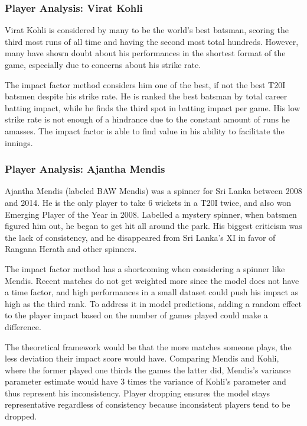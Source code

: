 \documentclass{article}[12pt]
\begin{document}
\subsubsection{Player Analysis: Virat Kohli}

Virat Kohli is considered by many to be the world's best batsman, scoring the third most runs of all time and having the second most total hundreds. \parencite{espn_2025_espncricinfo2} However, many have shown doubt about his performances in the shortest format of the game, especially due to concerns about his strike rate. \parencite{toisportsdesk_2024_usually}

The impact factor method considers him one of the best, if not the best T20I batsmen despite his strike rate. He is ranked the best batsman by total career batting impact, while he finds the third spot in batting impact per game. His low strike rate is not enough of a hindrance due to the constant amount of runs he amasses. The impact factor is able to find value in his ability to facilitate the innings.

\subsubsection{Player Analysis: Ajantha Mendis}

Ajantha Mendis (labeled BAW Mendis) was a spinner for Sri Lanka between 2008 and 2014. He is the only player to take 6 wickets in a T20I twice, and also  won Emerging Player of the Year in 2008. Labelled a mystery spinner, when batsmen figured him out, he began to get hit all around the park. His biggest criticism was the lack of consistency, and he disappeared from Sri Lanka's XI in favor of Rangana Herath and other spinners. \parencite{cricbuzz_2025_ajantha}

The impact factor method has a shortcoming when considering a spinner like Mendis. Recent matches do not get weighted more since the model does not have a time factor, and high performances in a small dataset could push his impact as high as the third rank. To address it in model predictions, adding a random effect to the player impact based on the number of games played could make a difference. 

The theoretical framework would be that the more matches someone plays, the less deviation their impact score would have. Comparing Mendis and Kohli, where the former played one thirds the games the latter did, Mendis's variance parameter estimate would have 3 times the variance of Kohli's parameter and thus represent his inconsistency. Player dropping ensures the model stays representative regardless of consistency because inconsistent players tend to be dropped.
\end{document}

